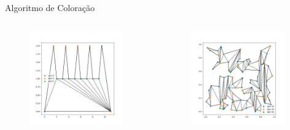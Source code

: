 \documentclass[aspectratio=169,usenames,dvipsnames]{beamer}
\begin{document}
\begin{frame}{Algoritmo de Coloração}
    \begin{columns}
      \begin{center}
        \begin{figure}
        \includegraphics[width=0.95\textwidth]{figures/corn_example_coloring.png}
        \end{figure}
      \end{center}
    \begin{center}
      \begin{figure}
        \includegraphics[width=0.95\textwidth]{figures/caxeiro_color.png}
      \end{figure}
    \end{center}
  \end{columns}
\end{frame}
\end{document}
